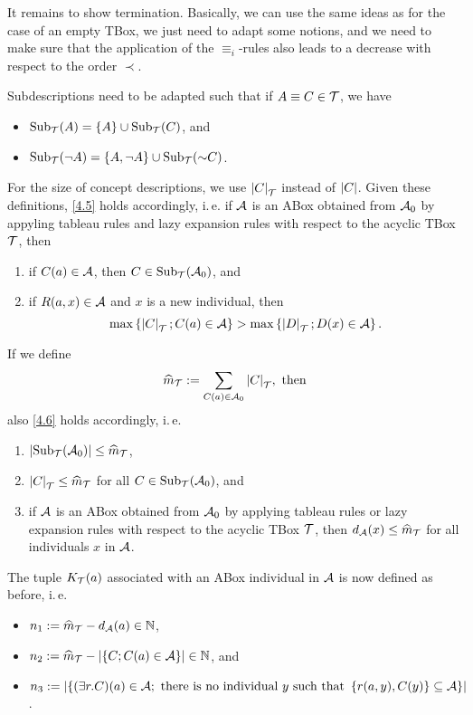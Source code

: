 \documentclass[openany]{scrbook}
\theoremstyle{break}
\theoremstyle{nonumberbreak}
\theoremstyle{nonumberplain}
\theoremstyle{nonumberbreak}
\newcommand{\then}{\Longrightarrow}
\newcommand{\N}{\mathbb{N}}
\newcommand{\abs}[2][]{\left|{#2}\right|\ifx#1\then\else_{#1}\fi}
\newcommand{\set}[1]{\left\{#1\right\}}
\newcommand{\ie}{i{.}\,e{.}\xspace}
\newcommand{\Sub}{\operatorname{Sub}}
\newcommand{\nnf}{\mathop{\sim\!}}
\begin{document}
It remains to show termination. Basically, we can use the same ideas
as for the case of an empty TBox, we just need to adapt some notions,
and we need to make sure that the application of the $\equiv_i$-rules
also leads to a decrease with respect to the order $\prec$.

Subdescriptions need to be adapted such that if $A \equiv C \in {\cal
  T}$, we have
\begin{itemize}
\item $\Sub_{\cal T}(A) = \set{A} \cup \Sub_{\cal T}(C)$, and
\item $\Sub_{\cal T}(\neg A) = \set{A, \neg A} \cup \Sub_{\cal T}(\nnf
  C)$.
\end{itemize}

For the size of concept descriptions, we use $\abs[{\cal T}]{C}$
instead of $\abs{C}$. Given these definitions, \cref{4.5} holds
accordingly, \ie if ${\cal A}$ is an ABox obtained from ${\cal A}_0$
by appyling tableau rules and lazy expansion rules with respect to the
acyclic TBox ${\cal T}$, then
\begin{enumerate}
\item if $C(a) \in {\cal A}$, then $C \in \Sub_{\cal T}({\cal A}_0)$, and
\item if $R(a, x) \in {\cal A}$ and $x$ is a new individual, then
  \begin{equation*}
    \max\set{\abs[{\cal T}]{C}; C(a) \in {\cal A}} >
    \max\set{\abs[{\cal T}]{D}; D(x) \in {\cal A}}.
  \end{equation*}
\end{enumerate}

If we define
\begin{equation*}
  \widehat{m}_{\cal T} := \sum_{C(a) \in {\cal A}_0}{\abs[{\cal
      T}]{C}},\ \text{then}
\end{equation*}
also \cref{4.6} holds accordingly, \ie
\begin{enumerate}
\item $\abs{\Sub_{\cal T}({\cal A}_0)} \leq \widehat{m}_{\cal T}$,
\item $\abs[{\cal T}]{C} \leq \widehat{m}_{\cal T}$ for all $C \in
  \Sub_{\cal T}({\cal A}_0)$, and
\item if ${\cal A}$ is an ABox obtained from ${\cal A}_0$ by applying
  tableau rules or lazy expansion rules with respect to the acyclic
  TBox ${\cal T}$, then $d_{\cal A}(x) \leq \widehat{m}_{\cal T}$ for
  all individuals $x$ in ${\cal A}$.
\end{enumerate}
The tuple $K_{\cal T}(a)$ associated with an ABox individual in ${\cal
  A}$ is now defined as before, \ie
\begin{itemize}
\item $n_1 := \widehat{m}_{\cal T} - d_{\cal A}(a) \in \N$,
\item $n_2 := \widehat{m}_{\cal T} - \abs{\set{C; C(a) \in {\cal A}}}
  \in \N$, and
\item $n_3 := \abs{\set{(\exists r.C)(a) \in {\cal A};\ \text{there is
        no individual}\ y\ \text{such that}\ \set{r(a, y), C(y)}
      \subseteq {\cal A}}}$.
\end{itemize}
\end{document}
